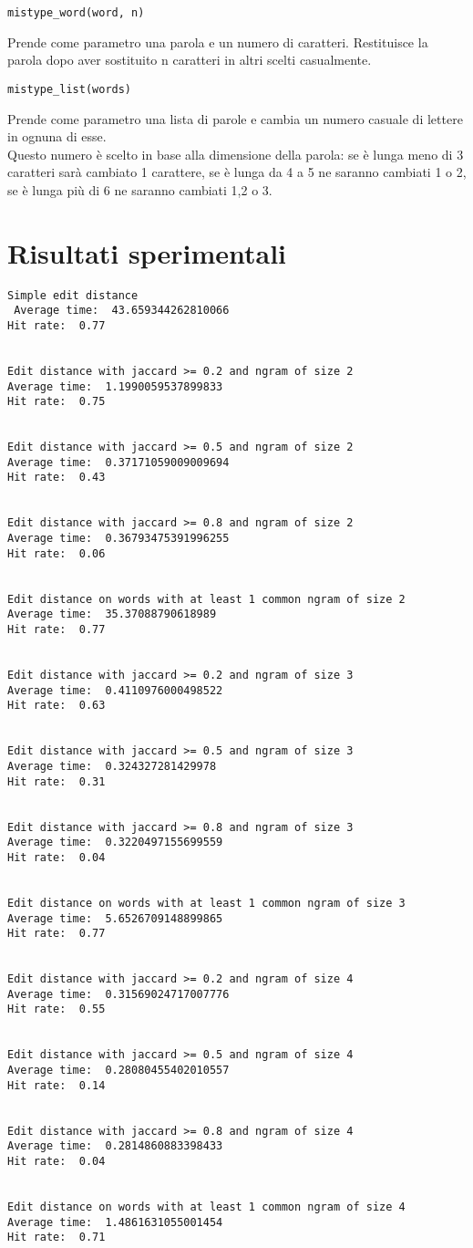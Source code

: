 \documentclass[]{article}
\begin{document}
\begin{verbatim}
mistype_word(word, n)
\end{verbatim}
Prende come parametro una parola e un numero di caratteri. Restituisce la parola dopo aver sostituito n caratteri in altri scelti casualmente.

\begin{verbatim}
mistype_list(words)
\end{verbatim}
Prende come parametro una lista di parole e cambia un numero casuale di lettere in ognuna di esse.\\ Questo numero è scelto in base alla dimensione della parola: se è lunga meno di 3 caratteri sarà cambiato 1 carattere, se è lunga da 4 a 5 ne saranno cambiati 1 o 2, se è lunga più di 6 ne saranno cambiati 1,2 o 3.\\
\newpage
\section{Risultati sperimentali}
\begin{verbatim}
Simple edit distance
 Average time:  43.659344262810066
Hit rate:  0.77 


Edit distance with jaccard >= 0.2 and ngram of size 2
Average time:  1.1990059537899833
Hit rate:  0.75 


Edit distance with jaccard >= 0.5 and ngram of size 2
Average time:  0.37171059009009694
Hit rate:  0.43 


Edit distance with jaccard >= 0.8 and ngram of size 2
Average time:  0.36793475391996255
Hit rate:  0.06 


Edit distance on words with at least 1 common ngram of size 2
Average time:  35.37088790618989
Hit rate:  0.77 


Edit distance with jaccard >= 0.2 and ngram of size 3
Average time:  0.4110976000498522
Hit rate:  0.63 


Edit distance with jaccard >= 0.5 and ngram of size 3
Average time:  0.324327281429978
Hit rate:  0.31 


Edit distance with jaccard >= 0.8 and ngram of size 3
Average time:  0.3220497155699559
Hit rate:  0.04 


Edit distance on words with at least 1 common ngram of size 3
Average time:  5.6526709148899865
Hit rate:  0.77 


Edit distance with jaccard >= 0.2 and ngram of size 4
Average time:  0.31569024717007776
Hit rate:  0.55 


Edit distance with jaccard >= 0.5 and ngram of size 4
Average time:  0.28080455402010557
Hit rate:  0.14 


Edit distance with jaccard >= 0.8 and ngram of size 4
Average time:  0.2814860883398433
Hit rate:  0.04 


Edit distance on words with at least 1 common ngram of size 4
Average time:  1.4861631055001454
Hit rate:  0.71 
\end{verbatim}
\newpage
\end{document}
